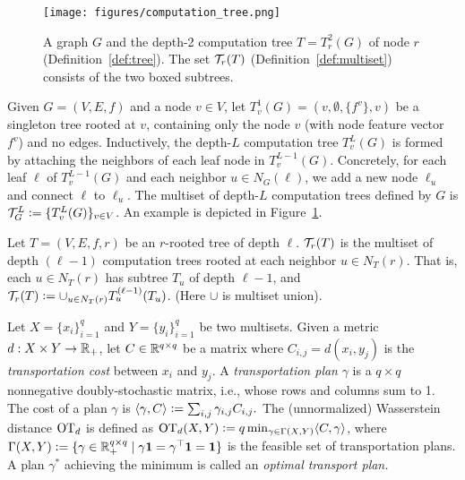 \begin{figure}[t]
  \centering
  \texttt{[image: figures/computation\_tree.png]}
  \caption{A graph $G$ and the depth-2 computation tree $T = T^2_r(G)$ of node $r$ (Definition~\ref{def:tree}). The set $\mathcal T_r(T)$ (Definition~\ref{def:multiset}) consists of the two boxed subtrees.}
  \label{fig:tree}
\end{figure}

\begin{definition}\label{def:tree} 
Given $G = (V, E, f)$ and a node $v \in V$, let $T_v^1(G) = (v, \emptyset, \{f^v\}, v)$ be a singleton tree rooted at $v$, containing only the node $v$ (with node feature vector $f^v$) and
no edges. Inductively, the depth-$L$ computation tree $T_v^L(G)$ is formed by attaching the neighbors of each leaf node in $T_v^{L-1}(G)$. Concretely, for each leaf $\ell$ of $T_v^{L-1}(G)$ and each neighbor $u \in N_G(\ell)$, we add a new node $\ell_u$ and connect $\ell$ to $\ell_u.$ The multiset of depth-$L$ computation trees defined by {$G$} is $\mathcal T_G^L \mathrel{\mathop:}= \{T_v^{L}(G)\}_{v \in V}$. An example is depicted in Figure~\ref{fig:tree}. 
\end{definition}

\begin{definition}\label{def:multiset} Let $T = (V, E, f, r)$ be an $r$-rooted tree of depth $\ell$. $\mathcal T_r(T)$ is the multiset of depth $(\ell-1)$ computation trees rooted at each neighbor {$u \in N_T(r)$}. That is, each $u \in N_T(r)$ has subtree $T_u$ of depth $\ell-1$, and $\mathcal T_r(T) \mathrel{\mathop:}= \cup_{u \in N_T(r)} {T^{(\ell-1)}_u}({T_u})$. (Here $\cup$ is multiset union).
\end{definition}

\begin{definition}\label{def:OT} Let $X = \{x_{i}\}_{i=1}^q$ and $Y = \{y_{i}\}_{i=1}^q$ be two multisets. Given a metric $d: X \times Y \to \mathbb R_{+}$, let $C\in \mathbb R^{q\times q}$ be a matrix where $C_{i,j} = d(x_i, y_j)$ is the \emph{transportation cost} between $x_i$ and $y_j$. A \emph{transportation plan} $\gamma$ is a $q \times q$ nonnegative doubly-stochastic matrix, i.e., whose rows and columns sum to 1. The cost of a plan $\gamma$ is $\langle \gamma, C \rangle \mathrel{\mathop:}= \sum_{i,j} \gamma_{i,j} C_{i,j}.$ The (unnormalized) Wasserstein distance $\textnormal{OT}_d$ is defined as ${\textnormal{OT}_d (X, Y) \mathrel{\mathop:}= q \min_{\gamma \in \Gamma(X, Y)} \langle C, \gamma \rangle}$, where ${\Gamma(X, Y) \mathrel{\mathop:}= \{\gamma \in \mathbb R^{q \times q}_+ \mid \gamma \bm{1} = \gamma^\top \bm{1} = \bm{1} \}}$ is the feasible set of transportation plans. A plan $\gamma^*$ achieving the minimum is called an \emph{optimal transport plan.}
\end{definition} 

